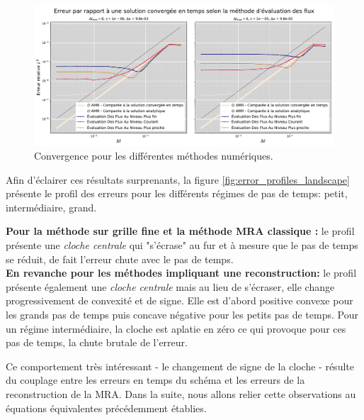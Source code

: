 \begin{figure}[h!]
    \centering
    \includegraphics[width=\textwidth]{media/4_travail/3/flux_reconstruction_method_diffusion.pdf}
    \caption{Convergence pour les différentes méthodes numériques.}
    \label{fig:convergence_diffusion_rok4}
\end{figure}
    Afin d'éclairer ces résultats surprenants, la figure \ref{fig:error_profiles_landscape} présente le profil des erreurs pour les différents régimes de pas de temps: petit, intermédiaire, grand.\par
    \textbf{Pour la méthode sur grille fine et la méthode MRA classique :} le profil présente une \textit{cloche centrale} qui "s'écrase" au fur et à mesure que le pas de temps se réduit, de fait l'erreur chute avec le pas de temps.\\
    \textbf{En revanche pour les méthodes impliquant une reconstruction:} le profil présente également une \textit{cloche centrale} mais au lieu de s'écraser,
    elle change progressivement de convexité et de signe.
    Elle est d'abord positive convexe pour les grands pas de temps puis concave négative pour les petits pas de temps.
    Pour un régime intermédiaire, la cloche est aplatie en zéro ce qui provoque pour ces pas de temps, la chute brutale de l'erreur.\par
    Ce comportement très intéressant - le changement de signe de la cloche - résulte du couplage entre les erreurs en temps du schéma et les erreurs de la reconstruction de la MRA. 
    Dans la suite, nous allons relier cette observations au équations équivalentes précédemment établies.
\clearpage
